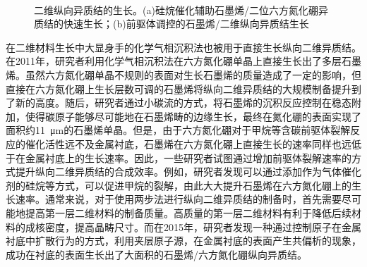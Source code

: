     \begin{figure}[htb]
        \\[-0.5ex]
        \caption{二维纵向异质结的生长。(a)硅烷催化辅助石墨烯/二位六方氮化硼异质结的快速生长；(b)前驱体调控的石墨烯/二维纵向异质结生长}
    \end{figure}

    在二维材料生长中大显身手的化学气相沉积法也被用于直接生长纵向二维异质结。在2011年，研究者利用化学气相沉积法在六方氮化硼单晶上直接生长出了多层石墨烯。虽然六方氮化硼单晶不规则的表面对生长石墨烯的质量造成了一定的影响，但直接在六方氮化硼上生长层数可调的石墨烯将纵向二维异质结的大规模制备提升到了新的高度。随后，研究者通过小碳流的方式，将石墨烯的沉积反应控制在稳态附加，使得碳原子能够尽可能地在石墨烯畴的边缘生长，最终在氮化硼的表面实现了面积约\SI{11}{\micro\metre}的石墨烯单晶。但是，由于六方氮化硼对于甲烷等含碳前驱体裂解反应的催化活性远不及金属衬底，石墨烯在六方氮化硼上直接生长的速率同样也远低于在金属衬底上的生长速率。因此，一些研究者试图通过增加前驱体裂解速率的方式提升纵向二维异质结的合成效率。例如，研究者发现可以通过添加作为气体催化剂的硅烷等方式，可以促进甲烷的裂解，由此大大提升石墨烯在六方氮化硼上的生长速率。通常来说，对于使用两步法进行纵向二维异质结的制备时，首先需要尽可能地提高第一层二维材料的制备质量。高质量的第一层二维材料有利于降低后续材料的成核密度，提高晶畴尺寸。而在2015年，研究者发现一种通过控制原子在金属衬底中扩散行为的方式，利用夹层原子源，在金属衬底的表面产生共偏析的现象，成功在衬底的表面生长出了大面积的石墨烯/六方氮化硼纵向异质结。
    
